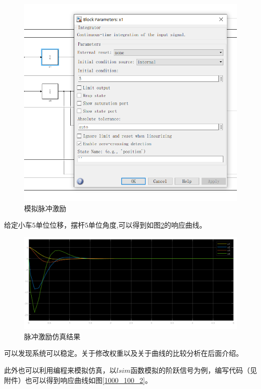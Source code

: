 \begin{figure}[hbpt]
\centering
\includegraphics[width=12cm]{initial.png}
\caption{模拟脉冲激励}\label{initial}
\end{figure}

给定小车$5$单位位移，摆杆$5$单位角度,可以得到如图\ref{1000_100}的响应曲线。

\begin{figure}[hbpt]
\centering
\includegraphics[width=15cm]{1000_100.png}
\caption{脉冲激励仿真结果}\label{1000_100}
\end{figure}

可以发现系统可以稳定。关于修改权重以及关于曲线的比较分析在后面介绍。

此外也可以利用编程来模拟仿真，以$lsim$函数模拟的阶跃信号为例，编写代码（见附件）也可以得到响应曲线如图\ref{1000_100_2}。

